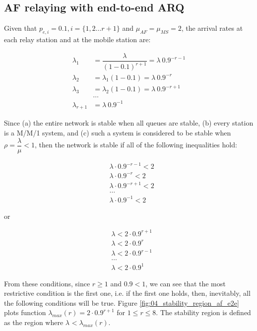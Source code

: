 \subsection{AF relaying with end-to-end ARQ}

Given that $p_{e,i} = 0.1, i = \{1,2 \dots r+1\}$ and $\mu_{AF} = \mu_{MS} = 2$,
the arrival rates at each relay station and at the mobile station are:

\begin{align*}
  \lambda_1 &= \dfrac{\lambda}{(1-0.1)^{r+1}} = \lambda\ 0.9^{-r-1} \\
  \lambda_2 &= \lambda_1 (1-0.1) = \lambda\ 0.9^{-r} \\
  \lambda_3 &= \lambda_2 (1-0.1) = \lambda\ 0.9^{-r + 1} \\
  & \dots \\
  \lambda_{r+1} &= \lambda\ 0.9^{-1}
\end{align*}

Since (a) the entire network is stable when all queues are stable, (b) every
station is a M/M/1 system, and (c) such a system is considered to be stable
when $\rho = \dfrac{\lambda}{\mu} < 1$, then the network is stable if all of the
following inequalities hold:

\begin{align*}
  &\lambda\cdot 0.9^{-r-1} < 2 \\
  &\lambda\cdot 0.9^{-r} < 2 \\
  &\lambda\cdot 0.9^{-r + 1} < 2 \\
  & \dots \\
  &\lambda\cdot 0.9^{-1} < 2
\end{align*}

or

\begin{align*}
  &\lambda < 2\cdot 0.9^{r+1}\\
  &\lambda < 2\cdot 0.9^{r}\\
  &\lambda < 2\cdot 0.9^{r-1}\\
  & \dots \\
  &\lambda < 2\cdot 0.9^{1}
\end{align*}

From these conditions, since $r \geq 1$ and $0.9 < 1$, we can see that the most
restrictive condition is the first one, i.e. if the first one holds, then,
inevitably, all the following conditions will be true. Figure
\ref{fig:04_stability_region_af_e2e} plots function
$\lambda_{max}(r) = 2 \cdot 0.9^{r+1}$ for $1 \leq r \leq 8$. The stability
region is defined as the region where $\lambda_{} < \lambda_{max}(r)$.

